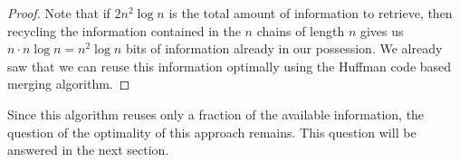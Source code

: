 \begin{proof}
Note that if \(2n^2 \log n\) is the total amount of information to retrieve,
then recycling the information contained in the \(n\) chains of length \(n\)
gives us \(n \cdot n \log n = n^2 \log n\) bits of information already in our
possession. We already saw that we can reuse this information optimally using
the Huffman code based merging algorithm.
\end{proof}

Since this algorithm reuses only a fraction of the available information, the
question of the optimality of this approach remains. This question will be
answered in the next section.
